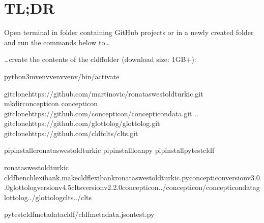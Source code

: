 \documentclass[letterpaper,10pt,english]{sphinxmanual}
\begin{document}
\chapter{TL;DR}
\label{\detokenize{TL;DR:id1}}\label{\detokenize{TL;DR::doc}}\label{\detokenize{TL;DR:module-ronataswestoldturkiccommands.__init__}}
\sphinxAtStartPar
Open terminal in folder containing GitHub projects or
in a newly created folder and run the commands below to…

\sphinxAtStartPar
…create the contents of the cldf\sphinxhyphen{}folder (download size: 1GB+):

\begin{sphinxVerbatim}[commandchars=\\\{\}]
python3\PYGZhy{}mvenvvenvvenv/bin/activate

gitclonehttps://github.com/martino\PYGZhy{}vic/ronataswestoldturkic.git
mkdirconcepticon
concepticon
gitclonehttps://github.com/concepticon/concepticon\PYGZhy{}data.git
..
gitclonehttps://github.com/glottolog/glottolog.git
gitclonehttps://github.com/cldf\PYGZhy{}clts/clts.git

pipinstall\PYGZhy{}eronataswestoldturkic
pipinstallloanpy
pipinstallpytest\PYGZhy{}cldf

ronataswestoldturkic
cldfbenchlexibank.makecldflexibank\PYGZus{}ronataswestoldturkic.py\PYGZhy{}\PYGZhy{}concepticon\PYGZhy{}versionv3.0.0\PYGZhy{}\PYGZhy{}glottolog\PYGZhy{}versionv4.5\PYGZhy{}\PYGZhy{}clts\PYGZhy{}versionv2.2.0\PYGZhy{}\PYGZhy{}concepticon../concepticon/concepticon\PYGZhy{}data\PYGZhy{}\PYGZhy{}glottolog../glottolog\PYGZhy{}\PYGZhy{}clts../clts

pytest\PYGZhy{}\PYGZhy{}cldf\PYGZhy{}metadatacldf/cldf\PYGZhy{}metadata.jsontest.py
\end{sphinxVerbatim}
\end{document}
